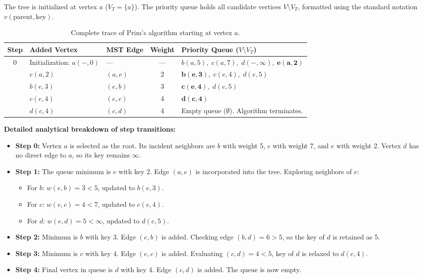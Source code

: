 \documentclass[11pt,a4paper]{article}
\begin{document}
The tree is initialized at vertex $a$ ($V_T = \{a\}$). The priority queue holds all candidate vertices $V \setminus V_T$, formatted using the standard notation $v(\text{parent}, \text{key})$.

\begin{table}[H]
\centering
\caption{Complete trace of Prim's algorithm starting at vertex $a$.}
\label{tab:prim_trace}
\begin{tabular}{c p{3.2cm} p{2.6cm} c p{6.4cm}}
\toprule
\textbf{Step} & \textbf{Added Vertex} & \textbf{MST Edge} & \textbf{Weight} & \textbf{Priority Queue ($V \setminus V_T$)} \\
\midrule
0 & Initialization: $a(-, 0)$ & --- & --- & $b(a, 5), \; c(a, 7), \; d(-, \infty), \; \mathbf{e(a, 2)}$ \\
\addlinespace
1 & $e(a, 2)$ & $(a, e)$ & 2 & $\mathbf{b(e, 3)}, \; c(e, 4), \; d(e, 5)$ \\
\addlinespace
2 & $b(e, 3)$ & $(e, b)$ & 3 & $\mathbf{c(e, 4)}, \; d(e, 5)$ \\
\addlinespace
3 & $c(e, 4)$ & $(e, c)$ & 4 & $\mathbf{d(c, 4)}$ \\
\addlinespace
4 & $d(c, 4)$ & $(c, d)$ & 4 & Empty queue ($\emptyset$). Algorithm terminates. \\
\bottomrule
\end{tabular}
\end{table}

\noindent \textbf{Detailed analytical breakdown of step transitions:}
\begin{itemize}
    \item \textbf{Step 0:} Vertex $a$ is selected as the root. Its incident neighbors are $b$ with weight 5, $c$ with weight 7, and $e$ with weight 2. Vertex $d$ has no direct edge to $a$, so its key remains $\infty$.
    \item \textbf{Step 1:} The queue minimum is $e$ with key 2. Edge $(a, e)$ is incorporated into the tree. Exploring neighbors of $e$:
    \begin{itemize}
        \item For $b$: $w(e, b) = 3 < 5$, updated to $b(e, 3)$.
        \item For $c$: $w(e, c) = 4 < 7$, updated to $c(e, 4)$.
        \item For $d$: $w(e, d) = 5 < \infty$, updated to $d(e, 5)$.
    \end{itemize}
    \item \textbf{Step 2:} Minimum is $b$ with key 3. Edge $(e, b)$ is added. Checking edge $(b, d) = 6 > 5$, so the key of $d$ is retained as 5.
    \item \textbf{Step 3:} Minimum is $c$ with key 4. Edge $(e, c)$ is added. Evaluating $(c, d) = 4 < 5$, key of $d$ is relaxed to $d(c, 4)$.
    \item \textbf{Step 4:} Final vertex in queue is $d$ with key 4. Edge $(c, d)$ is added. The queue is now empty.
\end{itemize}
\end{document}
